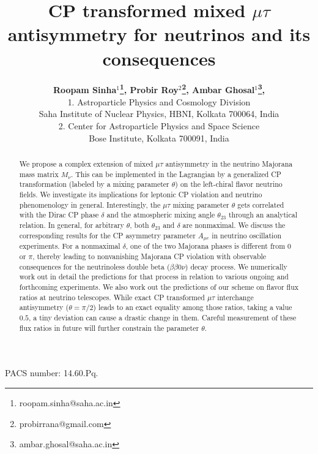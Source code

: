 \documentclass[11pt]{article}
\begin{document}
\title{\LARGE \bf CP transformed mixed $\mu\tau$ antisymmetry for neutrinos and its consequences}
\author{{\bf Roopam Sinha$^1$\footnote{roopam.sinha@saha.ac.in}, Probir Roy$^2$\footnote{probirrana@gmail.com}, Ambar Ghosal$^1$\footnote{ambar.ghosal@saha.ac.in},}\\
1. Astroparticle Physics and Cosmology Division\\Saha Institute of Nuclear Physics, HBNI, Kolkata 700064, India\\2. Center for Astroparticle Physics and Space Science \\ Bose Institute, Kolkata 700091, India} 
  
  
\maketitle

\begin{abstract}
We propose a complex extension of mixed $\mu\tau$ antisymmetry in the neutrino Majorana mass matrix $M_\nu$. This can be implemented in the Lagrangian by a generalized CP transformation (labeled by a mixing parameter $\theta$) on the left-chiral flavor neutrino fields. We investigate its implications for leptonic CP violation and neutrino phenomenology in general. Interestingly, the $\mu\tau$ mixing parameter $\theta$ gets correlated with the Dirac CP phase $\delta$ and the atmospheric mixing angle $\theta_{23}$ through an analytical relation. In general, for arbitrary $\theta$, both $\theta_{23}$ and $\delta$ are nonmaximal. We discuss the corresponding results for the CP asymmetry parameter $A_{\mu e}$ in neutrino oscillation experiments. For a nonmaximal $\delta$, one of the two Majorana phases is different from $0$ or $\pi$, thereby leading to nonvanishing Majorana CP violation with observable consequences for the neutrinoless double beta ($\beta\beta0\nu$) decay process. We numerically work out in detail the predictions for that process in relation to various ongoing and forthcoming experiments. We also work out the predictions of our scheme on flavor flux ratios at neutrino telescopes. While exact CP transformed $\mu\tau$ interchange antisymmetry  ($\theta=\pi/2$) leads to an exact equality among those ratios, taking a value $0.5$, a tiny deviation can cause a drastic change in them. Careful measurement of these flux ratios in future will further constrain the parameter $\theta$. 
\end{abstract}

PACS number: 14.60.Pq.
\end{document}
